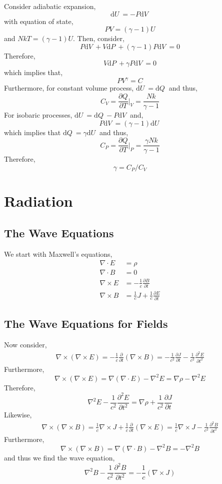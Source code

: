 \documentclass[12pt]{extarticle}
\renewcommand{\d}[1]{ \mathrm{d}#1 \:}
\newcommand{\pderiv}[2]{\frac{\partial{#1}}{\partial{#2}}}
\newcommand{\npar}[3]{\frac{\partial^{#1}{#2}}{\partial{#3}^{#1}}}
\theoremstyle{definition}
\begin{document}
Consider adiabatic expansion,
\[ \d{U} = - P \d{V} \]
with equation of state,
\[ PV = (\gamma - 1) U \]
and $N kT = (\gamma - 1) U$.
Then, consider,
\[ P \d{V} + V \d{P} +  (\gamma - 1) P \d{V} = 0 \]
Therefore, 
\[ V \d{P} + \gamma P \d{V} = 0 \]
which implies that,
\[ PV^\gamma = C \]
Furthermore, for constant volume process, $\d{U} = \d{Q}$ and thus,
\[ C_V = \pderiv{Q}{T} \bigg|_V  = \frac{N k}{\gamma - 1}  \]
For isobaric processes, $\d{U} = \d{Q} - P \d{V}$ and,
\[ P \d{V} = (\gamma - 1) \d{U} \]
which implies that $\d{Q} = \gamma \d{U}$ and thus, 
\[ C_P = \pderiv{Q}{T} \bigg|_P = \frac{\gamma N k}{\gamma - 1} \]
Therefore,
\[ \gamma = C_P / C_V \]



\section{Radiation}

\subsection{The Wave Equations}

We start with Maxwell's equations,
\begin{align*}
\nabla \cdot E & = \rho
\\
\nabla \cdot B & = 0
\\
\nabla \times E & = - \frac{1}{c} \pderiv{B}{t}
\\
\nabla \times B &= \frac{1}{c} J + \frac{1}{c} \pderiv{E}{t}
\end{align*}

\subsection{The Wave Equations for Fields}

Now consider,
\begin{align*}
\nabla \times (\nabla \times E) = - \frac{1}{c} \pderiv{}{t} (\nabla \times B) = - \frac{1}{c^2} \pderiv{J}{t} - \frac{1}{c^2} \npar{2}{E}{t}
\end{align*}
Furthermore,
\[ \nabla \times (\nabla \times E) = \nabla (\nabla \cdot E) - \nabla^2 E = \nabla \rho - \nabla^2 E \]
Therefore,
\[ \nabla^2 E  - \frac{1}{c^2} \npar{2}{E}{t} = \nabla \rho + \frac{1}{c^2} \pderiv{J}{t} \] 
Likewise,
\begin{align*}
\nabla \times (\nabla \times B) = \frac{1}{c} \nabla \times J + \frac{1}{c} \pderiv{}{t} (\nabla \times E) = \frac{1}{c} \nabla \times J - \frac{1}{c^2} \npar{2}{B}{t} 
\end{align*}
Furthermore, 
\[ \nabla \times (\nabla \times B) = \nabla (\nabla \cdot B) - \nabla^2 B = - \nabla^2 B \]
and thus we find the wave equation,
\[ \nabla^2 B - \frac{1}{c^2} \npar{2}{B}{t} = - \frac{1}{c} (\nabla \times J) \]
\end{document}
